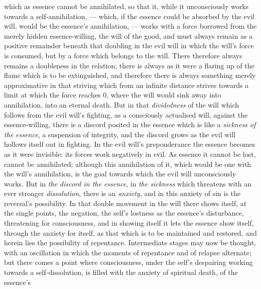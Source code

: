 \documentclass[12pt,a4paper]{book}
\begin{document}
which as essence cannot be annihilated, so that it, while it
unconsciously works towards a self-annihilation, --- which, if the essence could
be absorbed by the evil will, would be the essence's annihilation, --- works
with a force borrowed from the merely hidden essence-willing, the will of the
good, and must always remain as a positive remainder beneath that doubling in
the evil will in which the will's force is consumed, but by a force which
belongs to the will. There therefore always remains a doubleness in the
relation; there is always as it were a flaring up of the flame which is to be
extinguished, and therefore there is always something merely approximative in
that striving which from an infinite distance strives towards a limit at which
the force reaches 0, where the will would sink away into annihilation, into an
eternal death. But in that \emph{dividedness} of the will which follows from the
evil will's fighting, as a consciously actualised will, against the
essence-willing, there is a discord posited in the essence which is like a
\emph{sickness of the essence}, a suspension of integrity, and the discord grows
as the evil will hollows itself out in fighting. In the evil will's
preponderance the essence becomes as it were invisible: its forces work
negatively in evil. As essence it cannot be lost, cannot be annihilated;
although this annihilation of it, which would be one with the will's
annihilation, is the goal towards which the evil will unconsciously works. But
in \emph{the discord in the essence}, in \emph{the sickness} which threatens
with an ever stronger \emph{dissolution}, there is an \emph{anxiety}, and in
this anxiety of sin is the reversal's possibility. In that double
movement in the will there shows itself, at the single points, the negation, the
self's lostness as the essence's disturbance, threatening for consciousness, and
in showing itself it lets the essence show itself, through the anxiety for
itself, as that which is to be maintained and restored, and herein lies the
possibility of repentance. Intermediate stages may now be thought, with an
oscillation in which the moments of repentance and of relapse alternate; but
there comes a point where consciousness, under the self's despairing working
towards a self-dissolution, is filled with the anxiety of spiritual death, of
the essence's
\end{document}
